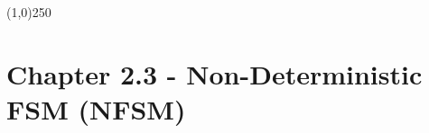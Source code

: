 \documentclass[12pt,a4paper]{article}
\begin{document}
\begin{center}\line(1,0){250}\end{center}

\section{Chapter 2.3 - Non-Deterministic FSM (NFSM)}
        \\\\
        \\\\
\end{document}
